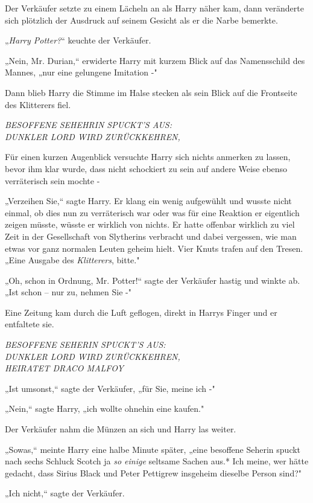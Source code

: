 {Der Verkäufer setzte zu einem Lächeln an als Harry näher kam, dann veränderte sich plötzlich der Ausdruck auf seinem Gesicht als er die Narbe bemerkte.

„\emph{Harry Potter?}“ keuchte der Verkäufer.

„Nein, Mr. Durian,“ erwiderte Harry mit kurzem Blick auf das Namensschild des Mannes, „nur eine gelungene Imitation -"

Dann blieb Harry die Stimme im Halse stecken als sein Blick auf die Frontseite des Klitterers fiel.

\emph{BESOFFENE SEHEHRIN SPUCKT'S AUS:\\ DUNKLER LORD WIRD ZURÜCKKEHREN,}

\hfill\break Für einen kurzen Augenblick versuchte Harry sich nichts anmerken zu lassen, bevor ihm klar wurde, dass nicht schockiert zu sein auf andere Weise ebenso verräterisch sein mochte -

„Verzeihen Sie,“ sagte Harry. Er klang ein wenig aufgewühlt und wusste nicht einmal, ob dies nun zu verräterisch war oder was für eine Reaktion er eigentlich zeigen müsste, wüsste er wirklich von nichts. Er hatte offenbar wirklich zu viel Zeit in der Gesellschaft von Slytherins verbracht und dabei vergessen, wie man etwas vor ganz normalen Leuten geheim hielt. Vier Knuts trafen auf den Tresen. „Eine Ausgabe des \emph{Klitterers}, bitte."

„Oh, schon in Ordnung, Mr. Potter!“ sagte der Verkäufer hastig und winkte ab. „Ist schon -- nur zu, nehmen Sie -"

Eine Zeitung kam durch die Luft geflogen, direkt in Harrys Finger und er entfaltete sie.

\emph{BESOFFENE SEHERIN SPUCKT'S AUS:\\ DUNKLER LORD WIRD ZURÜCKKEHREN,\\ HEIRATET DRACO MALFOY}

\hfill\break „Ist umsonst,“ sagte der Verkäufer, „für Sie, meine ich -"

„Nein,“ sagte Harry, „ich wollte ohnehin eine kaufen."

Der Verkäufer nahm die Münzen an sich und Harry las weiter.

„Sowas,“ meinte Harry eine halbe Minute später, „eine besoffene Seherin spuckt nach sechs Schluck Scotch ja \emph{so einige} seltsame Sachen aus.* Ich meine, wer hätte gedacht, dass Sirius Black und Peter Pettigrew insgeheim dieselbe Person sind?"

„Ich nicht,“ sagte der Verkäufer.

}

